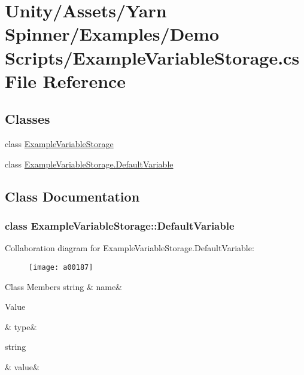 \hypertarget{a00131}{\section{Unity/\-Assets/\-Yarn Spinner/\-Examples/\-Demo Scripts/\-Example\-Variable\-Storage.cs File Reference}
\label{a00131}
}
\subsection*{Classes}
\begin{DoxyCompactItemize}
\item 
class \hyperlink{a00047}{Example\-Variable\-Storage}
\item 
class \hyperlink{a00047_a00179}{Example\-Variable\-Storage.\-Default\-Variable}
\end{DoxyCompactItemize}


\subsection{Class Documentation}
\label{a00179}
\hypertarget{a00047_a00179}{}
\subsubsection{class Example\-Variable\-Storage\-:\-:Default\-Variable}


Collaboration diagram for Example\-Variable\-Storage.\-Default\-Variable\-:
\nopagebreak
\begin{figure}[H]
\begin{center}
\leavevmode
\texttt{[image: a00187]}
\end{center}
\end{figure}
\begin{DoxyFields}{Class Members}
\hypertarget{a00047_a609feaa53936e7dc42248ff2ba68454a}{string}\label{a00047_a609feaa53936e7dc42248ff2ba68454a}
&
name&
\\
\hline

\hypertarget{a00047_a904347efdca12f40243c7dedb646153d}{Value}\label{a00047_a904347efdca12f40243c7dedb646153d}
&
type&
\\
\hline

\hypertarget{a00047_a0f00ecb21b58aa754a4bbb61edf62818}{string}\label{a00047_a0f00ecb21b58aa754a4bbb61edf62818}
&
value&
\\
\hline

\end{DoxyFields}
